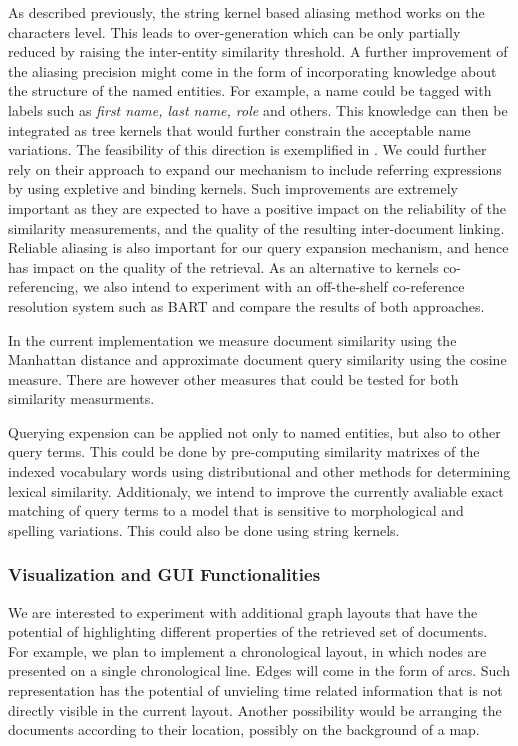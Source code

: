 As described previously, the string kernel based aliasing method works on the characters level. 
This leads to over-generation which can be only partially reduced by raising the inter-entity similarity threshold.   
A further improvement of the aliasing precision might come in the form of incorporating knowledge about the structure of the named entities. 
For example, a name could be tagged
with labels such as \emph{first name, last name, role} and others. This knowledge can then be integrated as tree kernels
that would further constrain the acceptable name variations. The feasibility of this direction is exemplified in \cite{string_kernel_coref}.
We could further rely on their approach to expand our mechanism to include referring expressions by using expletive and binding kernels.
Such improvements are extremely important as they are expected to have a positive impact on the reliability of the similarity measurements, and
the quality of the resulting inter-document linking. 
Reliable aliasing is also important for our query expansion mechanism, and hence has impact on the quality of the retrieval.
As an alternative to kernels co-referencing, we also intend to experiment with an off-the-shelf co-reference resolution system such as 
BART and compare the results of both approaches. 

In the current implementation we measure document similarity using the Manhattan distance and approximate document query similarity 
using the cosine measure. There are however other measures that could be tested for both similarity measurments. 

Querying expension can be applied not only to named entities, but also to other query terms. This could be done by pre-computing similarity matrixes
of the indexed vocabulary words using distributional and other methods for determining lexical similarity. Additionaly, we intend to improve
the currently avaliable exact matching of query terms to a model that is sensitive to morphological and spelling variations. This could also
be done using string kernels.


\subsubsection{Visualization and GUI Functionalities}

We are interested to experiment with additional graph layouts that have the potential of highlighting different properties of the 
retrieved set of documents. For example, we plan to implement a chronological layout, in which nodes are presented on a single chronological 
line. Edges will come in the form of arcs. Such representation has the potential of unvieling time related information that is not 
directly visible in the current layout. Another possibility would be arranging the documents according to their location, possibly on the background
of a map. 

